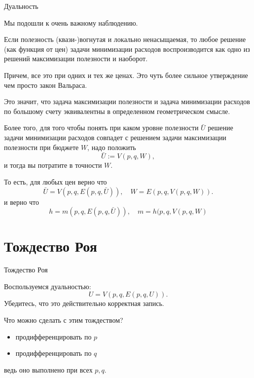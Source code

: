 \documentclass{beamer}
\begin{document}
\begin{frame}{Дуальность}

Мы подошли к очень важному наблюдению.

\begin{theorem}[Дуальность]

Если полезность (квази-)вогнутая и локально ненасыщаемая, то любое решение (как функция от цен) задачи минимизации расходов воспроизводится как одно из решений максимизации полезности и наоборот.
\end{theorem}
Причем, все это при одних и тех же ценах. Это чуть более сильное утверждение чем просто закон Вальраса. 

\end{frame}

\begin{frame}
Это значит, что задача максимизации полезности и задача минимизации расходов по большому счету эквивалентны в определенном геометрическом смысле. 

Более того, для того чтобы понять при каком уровне полезности $\bar U$ решение задачи минимизации расходов совпадет с решением задачи максимизации полезности при бюджете $W$, надо положить $$\bar U := V(p,q,W),$$ и тогда вы потратите в точности $W$.

\end{frame}

\begin{frame}

То есть, для любых цен верно что $$\bar U = V(p, q, E(p,q, \bar U)), \quad W = E(p,q, V(p,q,W)).$$
и верно что
$$ h = m(p, q, E(p,q, \bar U)), \quad m = h(p,q, V(p,q,W)$$
\end{frame}

\section{Тождество Роя}

\begin{frame}{Тождество Роя}

Воспользуемся дуальностью:
$$U = V(p, q, E(p,q,U)).$$
Убедитесь, что это действительно корректная запись.

Что можно сделать с этим тождеством?
\begin{itemize}
\item продифференцировать по $p$
\item продифференцировать по $q$
\end{itemize}
ведь оно выполнено при всех $p,q$.

\end{frame}
\end{document}
